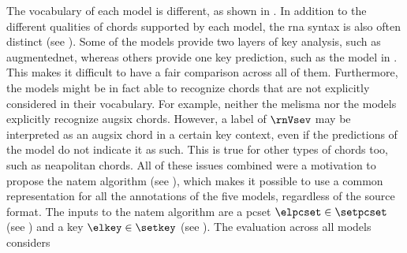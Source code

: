 
The vocabulary of each model is different, as shown in
. In addition to the different
qualities of chords supported by each model, the \gls{rna}
syntax is also often distinct (see
). Some of
the models provide two layers of key analysis, such as
\gls{augmentednet}, whereas others provide one key
prediction, such as the model in
\textcite{mcleod2021modular}. This makes it difficult to
have a fair comparison across all of them. Furthermore, the
models might be in fact able to recognize chords that are
not explicitly considered in their vocabulary. For example,
neither the \gls{melisma} nor the
\textcite{mcleod2021modular} models explicitly recognize
\gls{augsix} chords. However, a label of $\rnVsev$ may be
interpreted as an \gls{augsix} chord in a certain key
context, even if the predictions of the model do not
indicate it as such. This is true for other types of chords
too, such as \gls{neapolitan} chords. All of these issues
combined were a motivation to propose the \gls{natem}
algorithm (see
), which
makes it possible to use a common representation for all the
annotations of the five models, regardless of the source
format. The inputs to the \gls{natem} algorithm are a
\gls{pcset} $\elpcset \in \setpcset$ (see
) and a key $\elkey
\in \setkey$ (see ). The
evaluation across all models considers 

